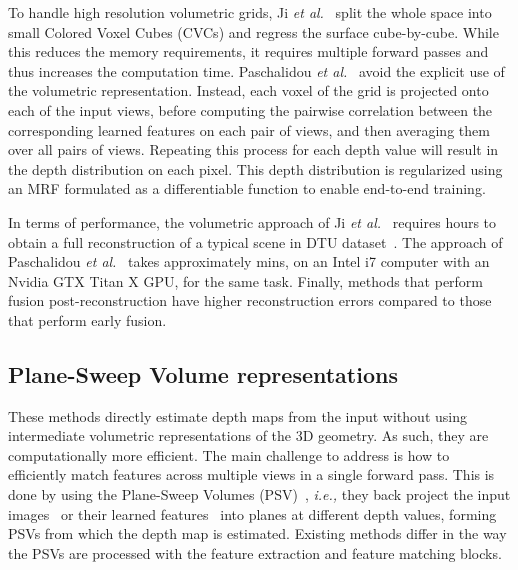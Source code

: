 \documentclass[10pt,journal,compsoc]{IEEEtran}
\newcommand{\ie}{\emph{i.e., }}
\newcommand{\etal}{\emph{et al.}}
\begin{document}
 To handle high resolution volumetric grids,  Ji \etal~\cite{ji2017surfacenet} split the whole space into small Colored Voxel Cubes (CVCs) and regress the surface  cube-by-cube. While this reduces the memory requirements, it requires multiple forward passes and thus increases the computation time.   Paschalidou \etal~\cite{Paschalidou_2018_CVPR}  avoid the explicit use of the volumetric representation. Instead, each voxel of the grid is projected onto each of the input views,  before computing the pairwise correlation between the corresponding learned features on each pair of views, and then averaging them over all pairs of views. Repeating this process for each depth value will result in the depth distribution on each pixel. This depth distribution is regularized using an MRF formulated as a differentiable function to enable end-to-end training.

In terms of performance, the volumetric approach of Ji \etal~\cite{ji2017surfacenet}   requires  hours to obtain a full reconstruction of a typical scene in DTU dataset~\cite{aanaes2016large}. The approach of Paschalidou \etal~\cite{Paschalidou_2018_CVPR} takes approximately mins, on an Intel i7 computer with an Nvidia GTX Titan X GPU, for the same task. Finally, methods   that perform fusion post-reconstruction have higher reconstruction errors compared to those that perform early fusion.
























\subsection{Plane-Sweep Volume representations}
\label{sec:mvs_depthbased}



These methods directly estimate depth maps from the input without using  intermediate volumetric representations of the 3D geometry. As such, they are computationally more efficient. The main challenge to address is how to efficiently match features across multiple views in a single forward pass.   This is done by using the  Plane-Sweep Volumes (PSV)~\cite{flynn2016deepstereo,huang2018deepmvs,leroy2018shape,yao2018mvsnet,Luo_2019_ICCV,Xue_2019_ICCV}, \ie they back project the input  images~\cite{flynn2016deepstereo,huang2018deepmvs,leroy2018shape}  or their learned features~\cite{yao2018mvsnet,Luo_2019_ICCV,Xue_2019_ICCV} into planes at different depth values, forming PSVs from which the depth map is estimated.  Existing methods differ in the way the PSVs are processed with the feature extraction and feature matching blocks.
\end{document}
